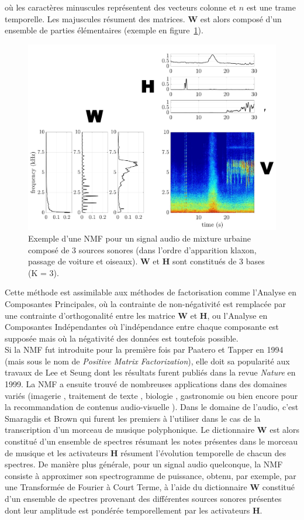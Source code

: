 où les caractères minuscules représentent des vecteurs colonne et $n$ est une trame temporelle. Les majuscules résument des matrices. $\mathbf{W}$ est alors composé d'un ensemble de parties élémentaires (exemple en figure~\ref{fig:ex_NMF}). 

\begin{figure}[t]
\centering
\includegraphics[width=.5\textwidth]{./figures/NMF/schema_introduction_nmf.pdf}
\caption{Exemple d'une NMF pour un signal audio de mixture urbaine composé de 3 sources sonores (dans l'ordre d'apparition klaxon, passage de voiture et oiseaux). $\mathbf{W}$ et $\mathbf{H}$ sont constitués de 3 bases (K = 3).}
\label{fig:ex_NMF}
\end{figure}


Cette méthode est assimilable aux méthodes de factorisation comme l'Analyse en Composantes Principales, où la contrainte de non-négativité est remplacée par une contrainte d'orthogonalité entre les matrice $\mathbf{W}$ et $\mathbf{H}$, ou l'Analyse en Composantes Indépendantes où l'indépendance entre chaque composante est supposée mais où la négativité des données est toutefois possible. \\


Si la NMF fut introduite pour la première fois par Paatero et Tapper \cite{paatero_positive_1994} en 1994 (mais sous le nom de \textit{Positive Matrix Factorization}), elle doit sa popularité aux travaux de Lee et Seung \cite{lee_learning_1999} dont les résultats furent publiés dans la revue \textit{Nature} en 1999. La NMF a ensuite trouvé de nombreuses applications dans des domaines variés 
(imagerie \cite{guillamet_introducing_2003} \cite{monga_robust_2007}, traitement de texte \cite{xu_document_2003} \cite{berry_email_2005}, biologie \cite{gao_improving_2005} \cite{chen_constrained_nodate}, gastronomie \cite{hawkins_clustering_2006} ou bien encore pour la recommandation de contenus audio-visuelle \cite{luo2014efficient}). Dans le domaine de l'audio, c'est Smaragdis et Brown \cite{smaragdis_non-negative_2003} qui furent les premiers à l'utiliser dans le cas de la transcription d'un morceau de musique polyphonique. Le dictionnaire $\mathbf{W}$ est alors constitué d'un ensemble de spectres résumant les notes présentes dans le morceau de musique et les activateurs $\mathbf{H}$ résument l'évolution temporelle de chacun des spectres. De manière plus générale, pour un signal audio quelconque, la NMF consiste à approximer son spectrogramme de puissance, obtenu, par exemple, par une Transformée de Fourier à Court Terme, à l'aide du dictionnaire $\textbf{W}$ constitué d'un ensemble de spectres provenant des différentes sources sonores présentes dont leur amplitude est pondérée temporellement par les activateurs $\textbf{H}$. 

